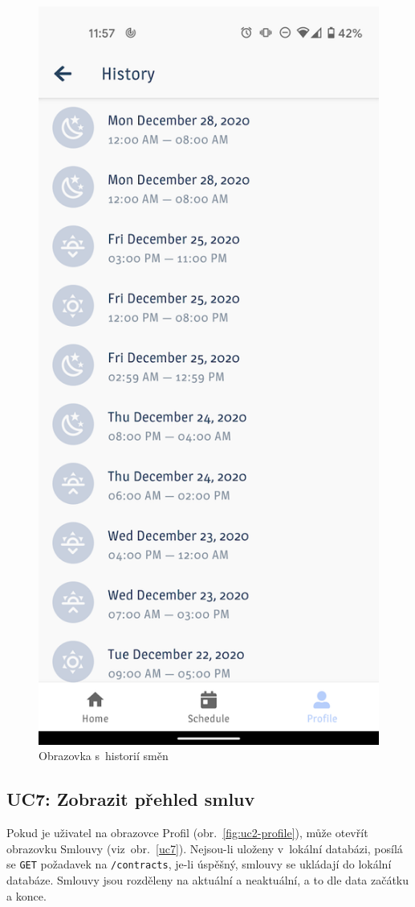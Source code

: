 \documentclass[twoside]{ctuthesis}
\begin{document}
\begin{figure}[ht]
	\includegraphics[width=.45\linewidth]{img/uc6.png}
	\caption{Obrazovka s~historií směn}
	\label{uc6}
\end{figure}
\newpage

\subsection{UC7: Zobrazit přehled smluv}

Pokud je uživatel na obrazovce Profil (obr.~\ref{fig:uc2-profile}), může otevřít obrazovku Smlouvy (viz~obr.~\ref{uc7}). Nejsou-li uloženy v~lokální databázi, posílá se \texttt{GET} požadavek na \texttt{/contracts}, je-li úspěšný, smlouvy se ukládají do lokální databáze. Smlouvy jsou rozděleny na aktuální a neaktuální, a to dle data začátku a konce.
\end{document}
